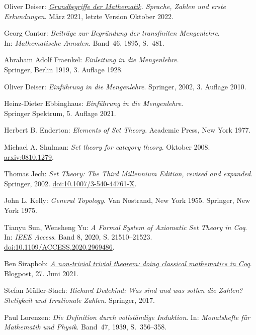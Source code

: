 \begin{thebibliography}{00}
Oliver Deiser:
\emph{\href{https://www.aleph1.info/?call=Puc&permalink=grundbegriffe}%
{Grundbegriffe der Mathematik}. Sprache, Zahlen und erste
Erkundungen}. März 2021, letzte Version Oktober 2022.

 Georg Cantor:
\emph{Beiträge zur Begründung der transfiniten Mengenlehre}.\\
In: \emph{Mathematische Annalen}. Band~46, 1895, S.~481.

 Abraham Adolf Fraenkel:
\emph{Einleitung in die Mengenlehre}.\\
Springer, Berlin 1919, 3. Auflage 1928.

 Oliver Deiser:
\emph{Einführung in die Mengenlehre}.
Springer, 2002, 3. Auflage 2010.

 Heinz-Dieter Ebbinghaus:
\emph{Einführung in die Mengenlehre}.\\
Springer Spektrum, 5. Auflage 2021.

 Herbert B. Enderton:
\emph{Elements of Set Theory}. Academic Press, New York 1977.

 Michael A. Shulman:
\emph{Set theory for category theory}.
Oktober 2008.\\
\href{https://arxiv.org/abs/0810.1279}{arxiv:0810.1279}.

 Thomas Jech: \emph{Set Theory: The Third Millennium
Edition, revised and expanded}. Springer, 2002.
\href{https://doi.org/10.1007/3-540-44761-X}{doi:10.1007/3-540-44761-X}.

 John L. Kelly: \emph{General Topology}. Van Nostrand,
New York 1955. Springer, New York 1975.

 Tianyu Sun, Wensheng Yu:
\emph{A Formal System of Axiomatic Set Theory in Coq}. In:
\emph{IEEE Access}. Band 8, 2020, S. 21510--21523.
\href{https://doi.org/10.1109/ACCESS.2020.2969486}{doi:10.1109/ACCESS.2020.2969486}.

 Ben Siraphob:
\href{https://siraben.dev/2021/06/27/classical-math-coq.html}{%
\emph{A non-trivial trivial theorem: doing classical mathematics in Coq}}.
Blogpost, 27. Juni 2021.

 Stefan Müller-Stach:
\emph{Richard Dedekind: Was sind und was sollen die Zahlen?
Stetigkeit und Irrationale Zahlen}. Springer, 2017.

 Paul Lorenzen:
\emph{Die Definition durch vollständige Induktion}.
In: \emph{Monatshefte für Mathematik und Physik}.
Band~47, 1939, S.~356--358.


\end{thebibliography}

